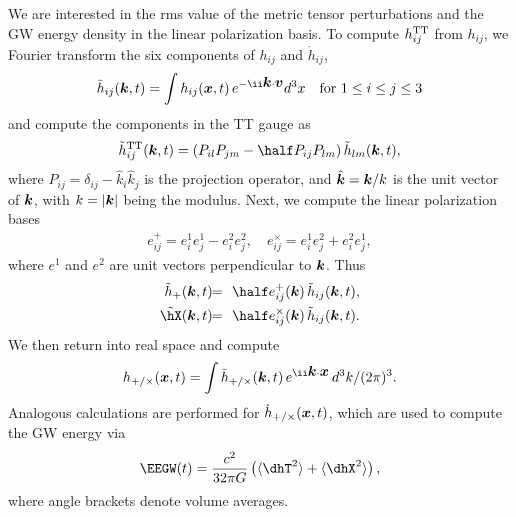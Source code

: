 \documentclass[\mydriver,12pt,twoside,notitlepage,a4paper]{article}
\renewcommand{\vec}[1]{\mbox{\boldmath{$#1$}}}
\newcommand{\kv}            {\vec{k}}
\newcommand{\vv}            {\vec{v}}
\newcommand{\xv}            {\vec{x}}
\newcommand{\bra}[1]{\langle #1\rangle}
\begin{document}
We are interested in the rms value of the metric tensor perturbations
and the GW energy density in the linear polarization basis.
To compute $h_{ij}^{\rm TT}$ from $h_{ij}$, we Fourier transform the
six components of $h_{ij}$ and $\dot{h}_{ij}$,
\begin{equation}
\tilde{h}_{ij}(\kv,t)=\int h_{ij}(\xv,t)\,e^{-\ii\kv\cdot\vv} d^3x
\quad\mbox{for $1\leq i\leq j\leq3$}
\end{equation}
and compute the components in the TT gauge as
\begin{equation}
\tilde{h}_{ij}^{\rm TT}(\kv,t)=(P_{il}P_{jm}-\half P_{ij}P_{lm})\,
\tilde{h}_{lm}(\kv,t),
\end{equation}
where $P_{ij}=\delta_{ij}-\hat k_i\hat k_j$ is the projection operator,
and $\hat{\kv}=\kv/k$ is the unit vector of $\kv$, with
$k=|\kv|$ being the modulus.
Next, we compute the linear polarization bases
\begin{eqnarray}
e^+_{ij}=e_i^1 e_j^1 - e_i^2 e_j^2,\quad
e^\times_{ij}=e_i^1 e_j^2 + e_i^2 e_j^1,
\end{eqnarray}
where $e^1$ and $e^2$ are unit vectors perpendicular to $\kv$.
Thus
\begin{eqnarray}
\tilde{h}_+(\kv,t) \!\!&=&\!\! \half e^+_{ij}(\kv) \, \tilde{h}_{ij}(\kv,t),\\
\tilde\hX(\kv,t) \!\!&=&\!\! \half e^\times_{ij}(\kv) \, \tilde{h}_{ij}(\kv,t).
\end{eqnarray}
We then return into real space and compute
\begin{equation}
h_{+/\times}(\xv,t)=\int \tilde{h}_{+/\times}(\kv,t)\,e^{\ii\kv\cdot\xv}
\, d^3k/(2\pi)^3.
\end{equation}
Analogous calculations are performed for $\dot{h}_{+/\times}(\xv,t)$,
which are used to compute the GW energy via
\begin{equation}
\EEGW(t)={c^2\over32\pi G}\left(\bra{\dhT^2}+\bra{\dhX^2}\right),
\label{EEGWdef}
\end{equation}
where angle brackets denote volume averages.
\end{document}
